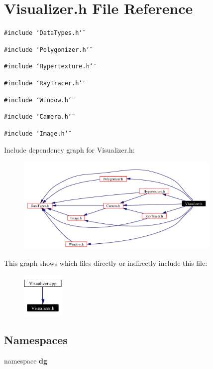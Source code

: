 \section{Visualizer.h File Reference}
\label{Visualizer_8h}
{\tt \#include \char`\"{}Data\-Types.h\char`\"{}}\par
{\tt \#include \char`\"{}Polygonizer.h\char`\"{}}\par
{\tt \#include \char`\"{}Hypertexture.h\char`\"{}}\par
{\tt \#include \char`\"{}Ray\-Tracer.h\char`\"{}}\par
{\tt \#include \char`\"{}Window.h\char`\"{}}\par
{\tt \#include \char`\"{}Camera.h\char`\"{}}\par
{\tt \#include \char`\"{}Image.h\char`\"{}}\par


Include dependency graph for Visualizer.h:\begin{figure}[H]
\begin{center}
\leavevmode
\includegraphics[width=279pt]{Visualizer_8h__incl}
\end{center}
\end{figure}


This graph shows which files directly or indirectly include this file:\begin{figure}[H]
\begin{center}
\leavevmode
\includegraphics[width=57pt]{Visualizer_8h__dep__incl}
\end{center}
\end{figure}
\subsection*{Namespaces}
\begin{CompactItemize}
\item 
namespace {\bf dg}
\end{CompactItemize}
